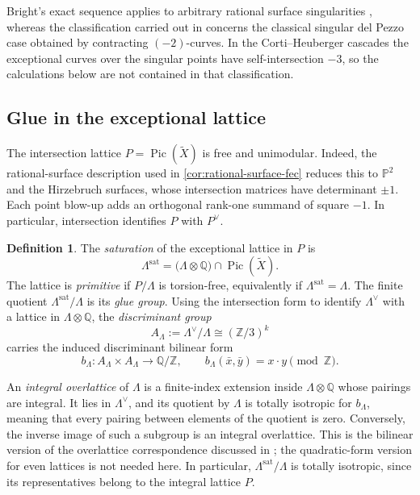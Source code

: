 \documentclass[11pt]{article}
\theoremstyle{plain}
\theoremstyle{definition}
\newtheorem{definition}[definition]{Definition}
\theoremstyle{remark}
\newcommand{\Pp}{\mathbb P}
\newcommand{\Z}{\mathbb Z}
\newcommand{\Pic}{\operatorname{Pic}}
\begin{document}
Bright's exact sequence applies to arbitrary rational surface singularities
\cite[Proposition~1]{Bright2013}, whereas the classification carried out in
\cite[Section~3]{Bright2013} concerns the classical singular del Pezzo case
obtained by contracting \((-2)\)-curves. In the Corti--Heuberger cascades the
exceptional curves over the singular points have self-intersection \(-3\), so
the calculations below are not contained in that classification.

\subsection{Glue in the exceptional lattice}
\label{app:brauer-glue}

The intersection lattice \(P=\Pic(\widetilde X)\) is free and unimodular.
Indeed, the rational-surface description used in
\cref{cor:rational-surface-fec} reduces this to \(\Pp^2\) and the
Hirzebruch surfaces, whose intersection matrices have determinant \(\pm1\).
Each point blow-up adds an orthogonal rank-one summand of square \(-1\).
In particular, intersection identifies \(P\) with \(P^\vee\).

\begin{definition}\label{def:brauer-glue}
The \emph{saturation} of the exceptional lattice in \(P\) is
\[
\Lambda^{\mathrm{sat}}
=
\bigl(\Lambda\otimes\mathbb Q\bigr)\cap\Pic(\widetilde X).
\]
The lattice is \emph{primitive} if \(P/\Lambda\) is torsion-free,
equivalently if \(\Lambda^{\mathrm{sat}}=\Lambda\). The finite quotient
\(\Lambda^{\mathrm{sat}}/\Lambda\) is its \emph{glue group}.
Using the intersection form to identify \(\Lambda^\vee\) with a lattice
in \(\Lambda\otimes\mathbb Q\), the \emph{discriminant group}
\[
A_\Lambda:=\Lambda^\vee/\Lambda\cong(\Z/3)^k
\]
carries the induced discriminant bilinear form
\[
b_\Lambda:A_\Lambda\times A_\Lambda\longrightarrow\mathbb Q/\Z,
\qquad
b_\Lambda(\bar x,\bar y)=x\cdot y\pmod\Z.
\]
\end{definition}

An \emph{integral overlattice} of \(\Lambda\) is a finite-index extension
inside \(\Lambda\otimes\mathbb Q\) whose pairings are integral. It lies
in \(\Lambda^\vee\), and its quotient by \(\Lambda\) is totally
isotropic for \(b_\Lambda\), meaning that every pairing between elements
of the quotient is zero. Conversely, the inverse image of such a subgroup
is an integral overlattice. This is the bilinear version of the
overlattice correspondence discussed in \cite[Section~1.4]{Nikulin1980};
the quadratic-form version for even lattices is not needed here.
In particular, \(\Lambda^{\mathrm{sat}}/\Lambda\) is totally isotropic,
since its representatives belong to the integral lattice \(P\).
\end{document}
